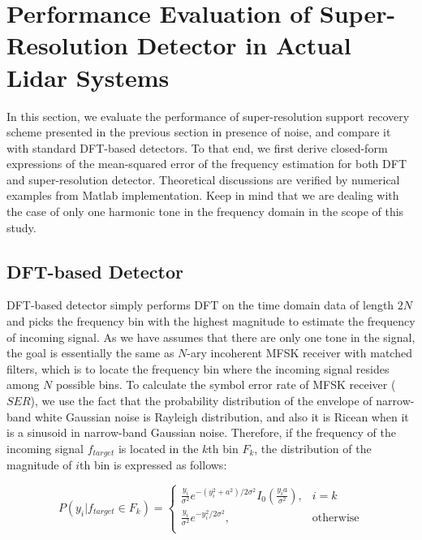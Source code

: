 \documentclass[11pt,journal, onecolumn]{IEEEtran}
\theoremstyle{theorem}
\begin{document}
\section{
    Performance Evaluation of Super-Resolution Detector in Actual Lidar Systems
}\label{sec:secthree}

In this section, we evaluate the performance of super-resolution support recovery scheme presented in the previous section in presence of noise, and compare it with standard DFT-based detectors. To that end, we first derive closed-form expressions of the mean-squared error of the frequency estimation for both DFT and super-resolution detector. Theoretical discussions are verified by numerical examples from Matlab implementation. Keep in mind that we are dealing with the case of only one harmonic tone in the frequency domain in the scope of this study.

\subsection{DFT-based Detector}

DFT-based detector simply performs DFT on the time domain data of length $2N$ and picks the frequency bin with the highest magnitude to estimate the frequency of incoming signal. As we have assumes that there are only one tone in the signal, the goal is essentially the same as $N$-ary incoherent MFSK receiver with matched filters, which is to locate the frequency bin where the incoming signal resides among $N$ possible bins. To calculate the symbol error rate of MFSK receiver ($SER$), we use the fact that the probability distribution of the envelope of narrow-band white Gaussian noise is Rayleigh distribution, and also it is Ricean when it is a sinusoid in narrow-band Gaussian noise. Therefore, if the frequency of the incoming signal $f_{target}$ is located in the $k$th bin $F_k$, the distribution of the magnitude of $i$th bin is expressed as follows:

\begin{equation}
    P(y_i|f_{target} \in F_k) = \left\{ \begin{array}{ll}
        \frac{y_i}{\sigma^2}e^{-(y_i^2+a^2)/2\sigma^2}I_0\left(\frac{y_ia}{\sigma^2}\right), & i=k \\ 
        \frac{y_i}{\sigma^2}e^{-y_i^2/2\sigma^2}, & \textrm{otherwise}\\
         \end{array}
    \right.
    \label{rayleigh}
\end{equation}
\end{document}
